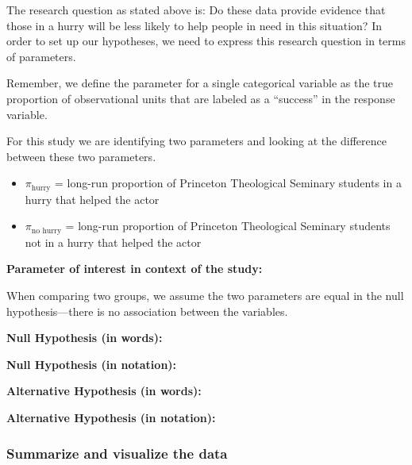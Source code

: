 \documentclass[
]{report}
\begin{document}
The research question as stated above is: Do these data provide evidence that those in a hurry will be less likely to help people in need in this situation? In order to set up our hypotheses, we need to express this research question in terms of parameters.

Remember, we define the parameter for a single categorical variable as the true proportion of observational units that are labeled as a ``success'' in the response variable.

For this study we are identifying two parameters and looking at the difference between these two parameters.

\begin{itemize}
\item
  \(\pi_\text{hurry}\) = long-run proportion of Princeton Theological Seminary students in a hurry that helped the actor
\item
  \(\pi_\text{no hurry}\) = long-run proportion of Princeton Theological Seminary students not in a hurry that helped the actor
\end{itemize}

\textbf{Parameter of interest in context of the study:}

\vspace{1in}

When comparing two groups, we assume the two parameters are equal in the null hypothesis---there is no association between the variables.

\textbf{Null Hypothesis (in words):}

\vspace{1in}

\textbf{Null Hypothesis (in notation):}

\vspace{0.3in}

\textbf{Alternative Hypothesis (in words):}

\vspace{1in}

\textbf{Alternative Hypothesis (in notation):}

\vspace{0.3in}

\subsubsection*{Summarize and visualize the data}\label{summarize-and-visualize-the-data-3}
\end{document}
